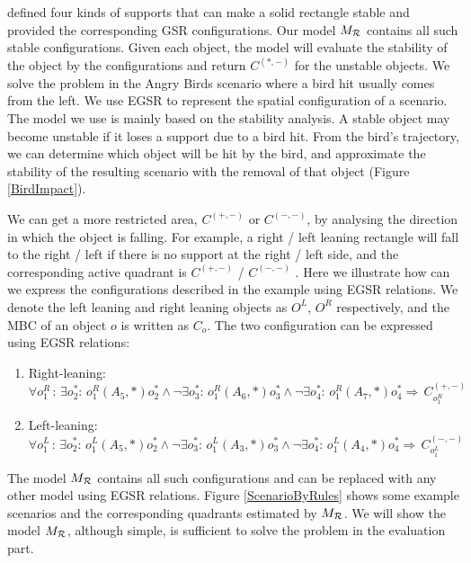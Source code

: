 \documentclass[letterpaper]{article}
\begin{document}
\cite{Ge2013} defined four kinds of supports that can make a solid rectangle stable and provided the corresponding GSR configurations. Our model $M_{\cal R}$ contains all such stable configurations. Given each object, the model will evaluate the stability of the object by the configurations and return $C^{(*,-)}$ for the unstable objects. We solve the problem in the Angry Birds scenario where a bird hit usually comes from the left. We use EGSR to represent the spatial configuration of a scenario. The model we use is mainly based on the stability analysis. A stable object may become unstable if it loses a support due to a bird hit. From the bird's trajectory, we can determine which object will be hit by the bird, and approximate the stability of the resulting scenario with the removal of that object (Figure \ref{BirdImpact}). 

We can get a more restricted area, $C^{(+,-)}$ or $C^{(-,-)}$, by analysing the direction in which the object is falling. For example, a right / left leaning rectangle will fall to the right / left if there is no support at the right / left side, and the corresponding active quadrant is $C^{(+,-)}$ / $C^{(-, -)}$%
. Here we illustrate how can we express the configurations described in the example using EGSR relations. We denote the left leaning and right leaning objects as $O^L$, $O^R$ respectively, and the MBC of an object $o$ is written as $C_{o}$. The two configuration can be expressed using EGSR relations:
\begin{enumerate}
\item Right-leaning: $\forall o^R_1\,:\, \exists o^*_2:\,o^R_1 (A_5, *) o^*_2 \wedge\neg\exists o^*_3:\,o^R_1 (A_6, *) o^*_3 \wedge\neg\exists o^*_4:\,o^R_1 (A_7, *) o^*_4 \Rightarrow \, C_{o^R_1}^{(+,-)}$

\item Left-leaning: $\forall o^L_1\,:\, \exists o^*_2:\,o^L_1 (A_5, *) o^*_2 \wedge\neg\exists o^*_3:\,o^L_1 (A_3, *) o^*_3 \wedge\neg\exists o^*_4:\,o^L_1 (A_4, *) o^*_4 \Rightarrow \, C_{o^L_1}^{(-,-)}$
\end{enumerate}
The model $M_{\cal{R}}$ contains all such configurations and can be replaced with any other model using EGSR relations. Figure \ref{ScenarioByRules} shows some example scenarios and the corresponding quadrants estimated by $M_{\cal{R}}$. We will show the model $M_{\cal{R}}$, although simple, is sufficient to solve the problem in the evaluation part.  


\end{document}
